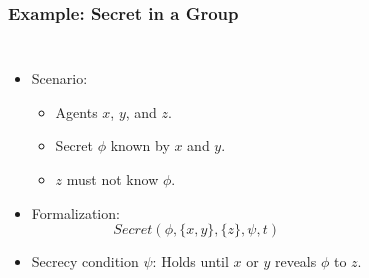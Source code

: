 \documentclass[aspectratio=169]{beamer}
\begin{document}
\begin{frame}
\frametitle{Example: Secret in a Group}

\begin{columns}[c]




\Large
\begin{itemize}
    \item Scenario:
    \begin{itemize}
        \item Agents $x$, $y$, and $z$.
        \item Secret $\phi$ known by $x$ and $y$.
        \item $z$ must not know $\phi$.
    \end{itemize}
    \item Formalization:
    \[
    Secret(\phi, \{x,y\}, \{z\}, \psi, t)
    \]
    \item Secrecy condition $\psi$: Holds until $x$ or $y$ reveals $\phi$ to $z$.
\end{itemize}



\end{columns}
\end{frame}
\end{document}
